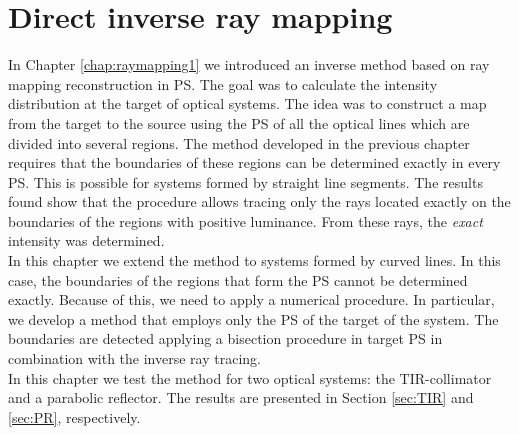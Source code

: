 \chapter{Direct inverse ray mapping}
\label{chap:raymapping2}
In Chapter \ref{chap:raymapping1} we introduced an inverse method based on ray mapping reconstruction in PS.
The goal was to calculate the intensity distribution at the target of optical systems. 
The idea was to construct a map from the target  to the source  using the PS of all the optical lines which are divided into several regions.  
The method developed in the previous chapter requires that the boundaries of these regions can be determined exactly in every PS. This is possible for systems formed by straight line segments.
The results found show that the procedure allows tracing only the rays located exactly on the boundaries of the regions with positive luminance. From these rays, the \textit{exact} intensity was determined. \\ \indent
In this chapter we extend the method to systems formed by curved lines. In this case, the boundaries of the regions that form the PS cannot be determined exactly.
Because of this, we need to apply a numerical procedure. In particular, we develop a method that employs only the PS of the target of the system. 
The boundaries are detected applying a bisection procedure in target PS in combination with the inverse ray tracing.\\ \indent
In this chapter we test the method for two optical systems: the TIR-collimator and a parabolic reflector. The results are presented in Section \ref{sec:TIR} and \ref{sec:PR}, respectively.
